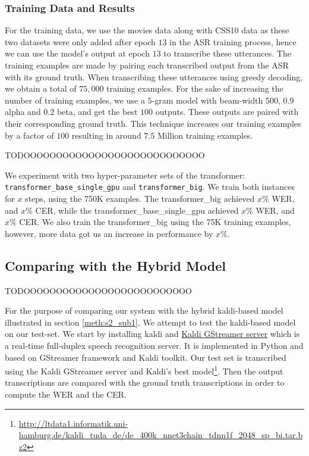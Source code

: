\subsubsection{Training Data and Results}
\label{meth:s4_sub7_subsub2}

For the training data, we use the movies data along with CSS10 data as these two datasets were only added after epoch $13$ in the \ac{ASR} training process, hence we can use the model's output at epoch $13$ to transcribe these utterances. The training examples are made by pairing each transcribed output from the \ac{ASR} with its ground truth. When transcribing these utterances using greedy decoding, we obtain a total of $75,000$ training examples. For the sake of increasing the number of training examples, we use a $5$-gram model with beam-width $500$, $0.9$ alpha and $0.2$ beta, and get the best $100$ outputs. These outputs are paired with their corresponding ground truth. This technique increases our training examples by a factor of $100$ resulting in around $7.5$ Million training examples. 

TODOOOOOOOOOOOOOOOOOOOOOOOOOOOO

We experiment with two hyper-parameter sets of the transformer: \texttt{transformer\_base\_single\_gpu} and \texttt{transformer\_big}. We train both instances for $x$ steps, using the 750K examples.
The transformer\_big achieved $x\%$ \ac{WER}, and $x\%$ \ac{CER}, while the transformer\_base\_single\_gpu  achieved $x\%$ \ac{WER}, and $x\%$ \ac{CER}. 
We also train the transformer\_big using the 75K training examples, however, more data got us an increase in performance by $x\%$.



\subsection{Comparing with the Hybrid Model}
\label{meth:s4_sub8}

TODOOOOOOOOOOOOOOOOOOOOOOOOOO

For the purpose of comparing our system with the hybrid kaldi-based model \cite{milde2018open} illustrated in section \ref{meth:s2_sub1}. We attempt to test the kaldi-based model on our test-set. We start by installing kaldi and \href{https://github.com/alumae/kaldi-gstreamer-server}{Kaldi GStreamer server} which is a real-time full-duplex speech recognition server. It is implemented in Python and based on GStreamer framework and Kaldi toolkit. Our test set is transcribed using the Kaldi GStreamer server and Kaldi's best model\footnote{\url{http://ltdata1.informatik.uni-hamburg.de/kaldi_tuda_de/de_400k_nnet3chain_tdnn1f_2048_sp_bi.tar.bz2}}. Then the output transcriptions are compared with the ground truth transcriptions in order to compute the \ac{WER} and the \ac{CER}. 

